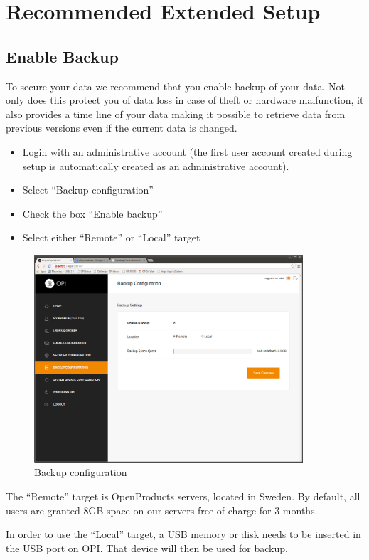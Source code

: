 \documentclass[12pt,a4paper,titlepage]{article}
\begin{document}
\newpage
\section{Recommended Extended Setup}
\subsection{Enable Backup}
To secure your data we recommend that you enable backup of your data. Not only does this protect you of data loss in case of theft or hardware malfunction, it also provides a time line of your data making it possible to retrieve data from previous versions even if the current data is changed.
\begin{itemize}
\item Login with an administrative account (the first user account created during setup is automatically created as an administrative account).
\item Select ``Backup configuration''
\item Check the box ``Enable backup''
\item Select either “Remote” or ``Local'' target
\end{itemize}

\begin{figure}[h!]
\centering
\includegraphics[width=10cm]{./img/backup_config}
\caption{Backup configuration}
\end{figure}

The ``Remote'' target is OpenProducts servers, located in Sweden. By default, all users are granted 8GB space on our servers free of charge for 3 months.

In order to use the ``Local'' target, a USB memory or disk needs to be inserted in the USB port on OPI. That device will then be used for backup.
\end{document}
